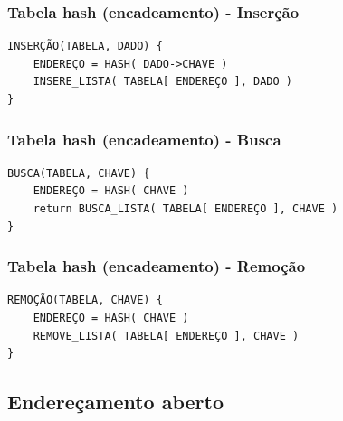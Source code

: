 \begin{frame}[fragile]
\frametitle{Tabela hash (encadeamento) - Inserção}
\begin{verbatim}
INSERÇÃO(TABELA, DADO) {
    ENDEREÇO = HASH( DADO->CHAVE )
    INSERE_LISTA( TABELA[ ENDEREÇO ], DADO )
}
\end{verbatim}
\end{frame}

\begin{frame}[fragile]
\frametitle{Tabela hash (encadeamento) - Busca}
\begin{verbatim}
BUSCA(TABELA, CHAVE) {
    ENDEREÇO = HASH( CHAVE )
    return BUSCA_LISTA( TABELA[ ENDEREÇO ], CHAVE )
}
\end{verbatim}
\end{frame}

\begin{frame}[fragile]
\frametitle{Tabela hash (encadeamento) - Remoção}
\begin{verbatim}
REMOÇÃO(TABELA, CHAVE) {
    ENDEREÇO = HASH( CHAVE )
    REMOVE_LISTA( TABELA[ ENDEREÇO ], CHAVE )
}
\end{verbatim}
\end{frame}

\subsection{Endereçamento aberto}



